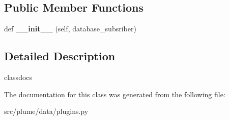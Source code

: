 \subsection*{Public Member Functions}
\begin{DoxyCompactItemize}
\item 
def {\bfseries \+\_\+\+\_\+init\+\_\+\+\_\+} (self, database\+\_\+subsriber)\hypertarget{classplume-creator_1_1src_1_1plume_1_1data_1_1plugins_1_1_plugins_ad2690b209ce8b2c3abf08edd2fb624f0}{}\label{classplume-creator_1_1src_1_1plume_1_1data_1_1plugins_1_1_plugins_ad2690b209ce8b2c3abf08edd2fb624f0}

\end{DoxyCompactItemize}


\subsection{Detailed Description}
classdocs 

The documentation for this class was generated from the following file\+:\begin{DoxyCompactItemize}
\item 
src/plume/data/plugins.\+py\end{DoxyCompactItemize}
